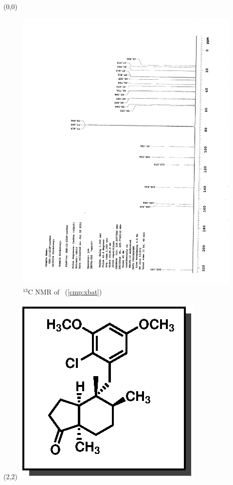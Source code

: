 \clearpage
\begin{textblock}{20}(0,0)
\begin{figure}[htb]
\caption{$^{13}$C NMR of  \CMPxbat\ (\ref{cmp:xbat})}
\includegraphics[scale=0.75, trim = 0mm 0mm 0mm 5mm,
clip]{chp_singlecarbon/images/nmr/xbatC}
\vspace{-100pt}
\end{figure}
\end{textblock}
\begin{textblock}{1}(2,2)
\includegraphics[scale=0.8, angle=90]{chp_singlecarbon/images/xbat}
\end{textblock}
\clearpage

